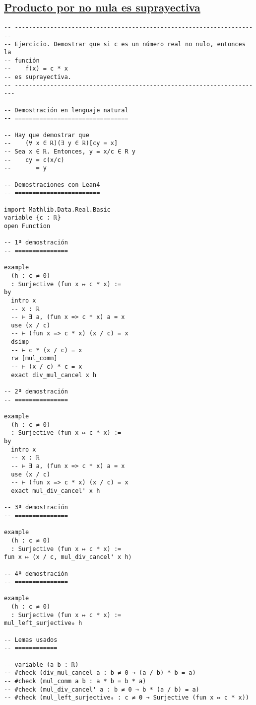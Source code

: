 \subsection{\href{./src/Logica/Producto\_por\_no\_nula\_es\_suprayectiva.lean}{Producto por no nula es suprayectiva}}
\label{sec:orgab1293c}
\begin{verbatim}
-- ---------------------------------------------------------------------
-- Ejercicio. Demostrar que si c es un número real no nulo, entonces la
-- función
--    f(x) = c * x
-- es suprayectiva.
-- ----------------------------------------------------------------------

-- Demostración en lenguaje natural
-- ================================

-- Hay que demostrar que
--    (∀ x ∈ ℝ)(∃ y ∈ ℝ)[cy = x]
-- Sea x ∈ ℝ. Entonces, y = x/c ∈ R y
--    cy = c(x/c)
--       = y

-- Demostraciones con Lean4
-- ========================

import Mathlib.Data.Real.Basic
variable {c : ℝ}
open Function

-- 1ª demostración
-- ===============

example
  (h : c ≠ 0)
  : Surjective (fun x ↦ c * x) :=
by
  intro x
  -- x : ℝ
  -- ⊢ ∃ a, (fun x => c * x) a = x
  use (x / c)
  -- ⊢ (fun x => c * x) (x / c) = x
  dsimp
  -- ⊢ c * (x / c) = x
  rw [mul_comm]
  -- ⊢ (x / c) * c = x
  exact div_mul_cancel x h

-- 2ª demostración
-- ===============

example
  (h : c ≠ 0)
  : Surjective (fun x ↦ c * x) :=
by
  intro x
  -- x : ℝ
  -- ⊢ ∃ a, (fun x => c * x) a = x
  use (x / c)
  -- ⊢ (fun x => c * x) (x / c) = x
  exact mul_div_cancel' x h

-- 3ª demostración
-- ===============

example
  (h : c ≠ 0)
  : Surjective (fun x ↦ c * x) :=
fun x ↦ ⟨x / c, mul_div_cancel' x h⟩

-- 4ª demostración
-- ===============

example
  (h : c ≠ 0)
  : Surjective (fun x ↦ c * x) :=
mul_left_surjective₀ h

-- Lemas usados
-- ============

-- variable (a b : ℝ)
-- #check (div_mul_cancel a : b ≠ 0 → (a / b) * b = a)
-- #check (mul_comm a b : a * b = b * a)
-- #check (mul_div_cancel' a : b ≠ 0 → b * (a / b) = a)
-- #check (mul_left_surjective₀ : c ≠ 0 → Surjective (fun x ↦ c * x))
\end{verbatim}

